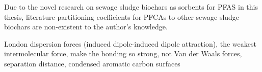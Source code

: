Due to the novel research on sewage sludge biochars as sorbents for PFAS in this thesis, literature partitioning coefficients for PFCAs to other sewage sludge biochars are non-existent to the author's knowledge.

London dispersion forces (induced dipole-induced dipole attraction), the weakest intermolecular force, make the bonding so strong, not Van der Waals forces,  separation distance, condensed aromatic carbon surfaces \citep{Cornelissen2005}


